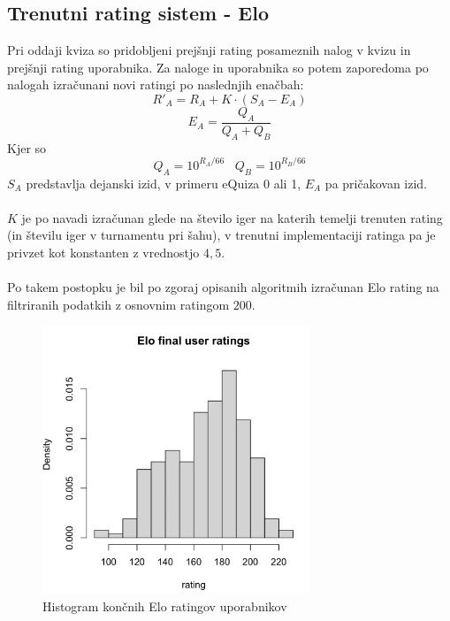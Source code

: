 \documentclass{IEEEtran}
\makeatletter
\let\old@subsection\subsection
\renewcommand{\subsection}[1]{\bigskip\old@subsection{#1}\@afterindentfalse\@afterheading}
\makeatother
\begin{document}
\subsection{Trenutni rating sistem - Elo}
Pri oddaji kviza so pridobljeni prejšnji rating posameznih nalog v kvizu in prejšnji rating uporabnika. Za naloge in uporabnika so potem zaporedoma po nalogah izračunani novi ratingi po naslednjih enačbah:
\begin{equation}
    R'_{A}=R_{A}+K\cdot \left ( S_{A}-E_{A} \right )
\end{equation}
\begin{equation}
    E_{A}=\frac{Q_{A}}{Q_{A}+Q_{B}}
\end{equation}
Kjer so
\begin{equation}
    Q_{A}=10^{R_{A}/66}\;\;\;Q_{B}=10^{R_{B}/66}
\end{equation}
$S_{A}$ predstavlja dejanski izid, v primeru eQuiza 0 ali 1, $E_{A}$ pa pričakovan izid.
\hfill
\\
\\
$K$ je po navadi izračunan glede na število iger na katerih temelji trenuten rating (in številu iger v turnamentu pri šahu),
v trenutni implementaciji ratinga pa je privzet kot konstanten z vrednostjo $4,5$.
\hfill
\\
\\
Po takem postopku je bil po zgoraj opisanih algoritmih izračunan Elo rating na filtriranih podatkih z osnovnim ratingom $200$.
\begin{figure}[h!]
    \includegraphics[width=8cm]{ComputedELO}
    \caption{Histogram končnih Elo ratingov uporabnikov}%
    \label{fig:example}%
\end{figure}
\end{document}
